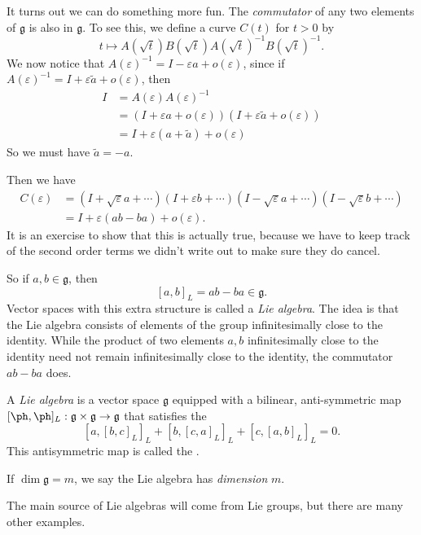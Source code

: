 \documentclass[a4paper]{article}
\begin{document}
It turns out we can do something more fun. The \emph{commutator} of any two elements of $\mathfrak{g}$ is also in $\mathfrak{g}$. To see this, we define a curve $C(t)$ for $t > 0$ by
\[
  t \mapsto A(\sqrt{t}) B(\sqrt{t}) A(\sqrt{t})^{-1} B(\sqrt{t})^{-1}.
\]
We now notice that $A(\varepsilon)^{-1} = I - \varepsilon a + o(\varepsilon)$, since if $A(\varepsilon)^{-1} = I + \varepsilon \tilde{a} + o(\varepsilon)$, then
\begin{align*}
  I &= A(\varepsilon) A(\varepsilon)^{-1}\\
  &= (I + \varepsilon a + o(\varepsilon))(I + \varepsilon \tilde{a} + o(\varepsilon))\\
  &= I + \varepsilon(a + \tilde{a}) + o(\varepsilon)
\end{align*}
So we must have $\tilde{a} = -a$.

Then we have
\begin{align*}
  C(\varepsilon) &= (I + \sqrt{\varepsilon} a + \cdots)(I + \varepsilon b + \cdots) (I - \sqrt{\varepsilon} a + \cdots )(I - \sqrt{\varepsilon} b + \cdots)\\
  &= I + \varepsilon(ab - ba) + o(\varepsilon).
\end{align*}
It is an exercise to show that this is actually true, because we have to keep track of the second order terms we didn't write out to make sure they do cancel.

So if $a, b \in \mathfrak{g}$, then
\[
  [a, b]_L = ab - ba \in \mathfrak{g}.
\]
Vector spaces with this extra structure is called a \emph{Lie algebra}. The idea is that the Lie algebra consists of elements of the group infinitesimally close to the identity. While the product of two elements $a, b$ infinitesimally close to the identity need not remain infinitesimally close to the identity, the commutator $ab - ba$ does.

\begin{defi}
  A \emph{Lie algebra} is a vector space $\mathfrak{g}$ equipped with a bilinear, anti-symmetric map $[\ph, \ph]_L: \mathfrak{g} \times \mathfrak{g} \to \mathfrak{g}$ that satisfies the 
  \[
    [a, [b, c]_L]_L + [b, [c, a]_L]_L + [c, [a, b]_L]_L = 0.
  \]
  This antisymmetric map is called the .

  If $\dim \mathfrak{g} = m$, we say the Lie algebra has \emph{dimension} $m$.
\end{defi}

The main source of Lie algebras will come from Lie groups, but there are many other examples.
\end{document}
